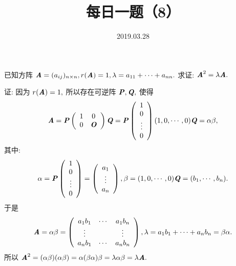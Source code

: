 \documentclass[UTF8]{ctexart}
\title{\textbf{每日一题（8）}}
\date{2019.03.28}
\begin{document}
\maketitle
已知方阵 $\textbf{\textit{A}}=(a_{ij})_{n\times n}, r(\textbf{\textit{A}})=1,\lambda=a_{11}+\cdots+a_{nn}.$ 求证: $\textbf{\textit{A}}^2=\lambda\textbf{\textit{A}}.$

证: 因为 $r(\textbf{\textit{A}})=1,$ 所以存在可逆阵 $\textbf{\textit{P}},\textbf{\textit{Q}},$ 使得
\[
\textbf{\textit{A}}=\textbf{\textit{P}}\left(
\begin{array}{cc}
1 & 0 \\
0 &\textbf{\textit{O}}
\end{array}\right)\textbf{\textit{Q}}=\textbf{\textit{P}}\left(\begin{array}{c}
1 \\
0 \\
\vdots \\
0
\end{array}\right)(1,0,\cdots,0)\textbf{\textit{Q}}=\alpha \beta,
\]
其中:
\[
\alpha=\textbf{\textit{P}}\left(\begin{array}{c}
1 \\
0 \\
\vdots
\\0
\end{array}\right)=
\left(\begin{array}{c}
a_1 \\ \vdots \\a_n
\end{array}\right),
\beta=(1,0,\cdots,0) \textbf{\textit{Q}}=(b_1,\cdots,b_n).
\]
于是
\[
\textbf{\textit{A}}=\alpha \beta =\left( \begin{array}{ccc}
                                    a_1 b_1 & \cdots & a_1 b_n \\
                                    \vdots &   & \vdots \\
                                    a_n b_1 & \cdots & a_n b_n
                                  \end{array} \right),
\lambda = a_1 b_1+ \cdots + a_n b_n=\beta \alpha .
\]
所以 $\textbf{\textit{A}}^2=(\alpha \beta)(\alpha \beta)=\alpha(\beta \alpha)\beta=\lambda \alpha \beta =\lambda \textbf{\textit{A}}.$
\end{document}
